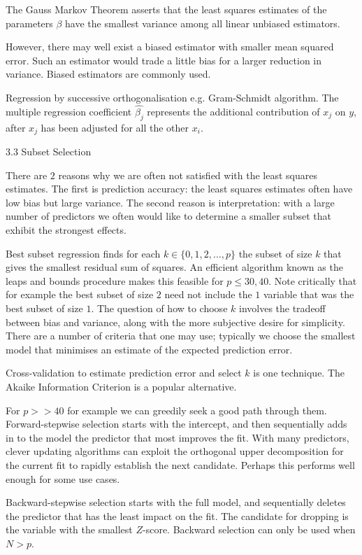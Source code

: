 The Gauss Markov Theorem asserts that the least squares estimates of the parameters $\beta$ have the smallest variance among all linear unbiased estimators.

However, there may well exist a biased estimator with smaller mean squared error. Such an estimator would trade a little bias for a larger reduction in variance. Biased estimators are commonly used.

Regression by successive orthogonalisation e.g. Gram-Schmidt algorithm. The multiple regression coefficient $\hat{\beta_j}$ represents the additional contribution of $x_j$ on $y$, after $x_j$ has been adjusted for all the other $x_i$.

3.3 Subset Selection

There are $2$ reasons why we are often not satisfied with the least squares estimates. The first is prediction accuracy: the least squares estimates often have low bias but large variance. The second reason is interpretation: with a large number of predictors we often would like to determine a smaller subset that exhibit the strongest effects.

Best subset regression finds for each $k \in \{0,1,2,\dots,p \}$ the subset of size $k$ that gives the smallest residual sum of squares. An efficient algorithm known as the leaps and bounds procedure makes this feasible for $p\le 30,40$. Note critically that for example the best subset of size $2$ need not include the $1$ variable that was the best subset of size $1$. The question of how to choose $k$ involves the tradeoff between bias and variance, along with the more subjective desire for simplicity. There are a number of criteria that one may use; typically we choose the smallest model that minimises an estimate of the expected prediction error.

Cross-validation to estimate prediction error and select $k$ is one technique. The Akaike Information Criterion is a popular alternative.

For $p>>40$ for example we can greedily seek a good path through them. Forward-stepwise selection starts with the intercept, and then sequentially adds in to the model the predictor that most improves the fit. With many predictors, clever updating algorithms can exploit the orthogonal upper decomposition for the current fit to rapidly establish the next candidate. Perhaps this performs well enough for some use cases.

Backward-stepwise selection starts with the full model, and sequentially deletes the predictor that has the least impact on the fit. The candidate for dropping is the variable with the smallest $Z$-score. Backward selection can only be used when $N > p$.

